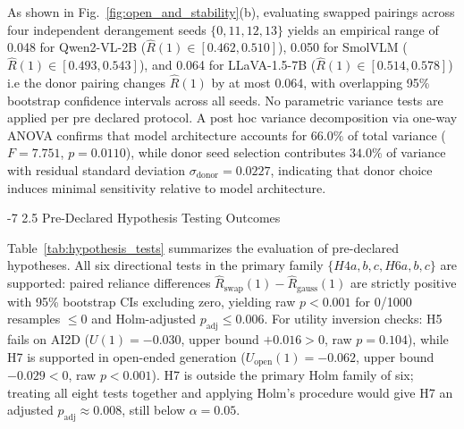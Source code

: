 \documentclass[graybox]{svmult}
\makeatletter
\renewcommand\subsection{\@startsection{subsection}{2}{\z@}%
  {-7\p@ \@plus -2\p@ \@minus -1\p@}%
  {2.5\p@ \@plus 1\p@ \@minus 1\p@}%
  {\normalfont\normalsize\bfseries\boldmath}}
\makeatother
\begin{document}
As shown in Fig.~\ref{fig:open_and_stability}(b), evaluating swapped pairings across four independent derangement seeds $\{0,11,12,13\}$ yields an empirical range of 0.048 for Qwen2-VL-2B ($\hat{R}(1) \in [0.462,0.510]$), 0.050 for SmolVLM ($\hat{R}(1) \in [0.493,0.543]$), and 0.064 for LLaVA-1.5-7B ($\hat{R}(1) \in [0.514,0.578]$) i.e the donor pairing changes $\hat{R}(1)$ by at most 0.064, with overlapping 95\% bootstrap confidence intervals across all seeds. No parametric variance tests are applied per pre declared protocol. A post hoc variance decomposition via one-way ANOVA confirms that model architecture accounts for $66.0\%$ of total variance ($F = 7.751$, $p = 0.0110$), while donor seed selection contributes $34.0\%$ of variance with residual standard deviation $\sigma_{\text{donor}} = 0.0227$, indicating that donor choice induces minimal sensitivity relative to model architecture.

\subsection{Pre-Declared Hypothesis Testing Outcomes}
\label{sec:extension_hypotheses}

Table~\ref{tab:hypothesis_tests} summarizes the evaluation of pre-declared hypotheses. All six directional tests in the primary family $\{H4a,b,c,H6a,b,c\}$ are supported: paired reliance differences $\hat{R}_{\text{swap}}(1) - \hat{R}_{\text{gauss}}(1)$ are strictly positive with 95\% bootstrap CIs excluding zero, yielding raw $p < 0.001$ for 0/1000 resamples $\le 0$ and Holm-adjusted $p_{\text{adj}} \le 0.006$. For utility inversion checks: H5 fails on AI2D ($U(1) = -0.030$, upper bound $+0.016 > 0$, raw $p = 0.104$), while H7 is supported in open-ended generation ($U_{\text{open}}(1) = -0.062$, upper bound $-0.029 < 0$, raw $p < 0.001$). H7 is outside the primary Holm family of six; treating all eight tests together and applying Holm's procedure would give H7 an adjusted $p_{\text{adj}} \approx 0.008$, still below $\alpha = 0.05$.
\end{document}
